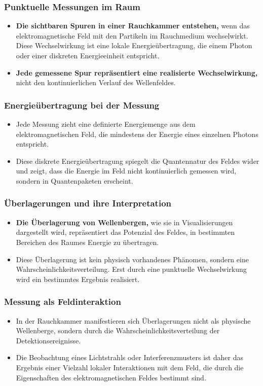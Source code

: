 \documentclass[12pt,a4paper]{article}
\begin{document}
	\subsubsection{Punktuelle Messungen im Raum}
	\begin{itemize}
		\item \textbf{Die sichtbaren Spuren in einer Rauchkammer entstehen,} wenn das elektromagnetische Feld mit den Partikeln im Rauchmedium wechselwirkt. Diese Wechselwirkung ist eine lokale Energieübertragung, die einem Photon oder einer diskreten Energieeinheit entspricht.
		\item \textbf{Jede gemessene Spur repräsentiert eine realisierte Wechselwirkung,} nicht den kontinuierlichen Verlauf des Wellenfeldes.
	\end{itemize}
	
	\subsubsection{Energieübertragung bei der Messung}
	\begin{itemize}
		\item Jede Messung zieht eine definierte Energiemenge aus dem elektromagnetischen Feld, die mindestens der Energie eines einzelnen Photons entspricht.
		\item Diese diskrete Energieübertragung spiegelt die Quantennatur des Feldes wider und zeigt, dass die Energie im Feld nicht kontinuierlich gemessen wird, sondern in Quantenpaketen erscheint.
	\end{itemize}
	
	\subsubsection{Überlagerungen und ihre Interpretation}
	\begin{itemize}
		\item \textbf{Die Überlagerung von Wellenbergen,} wie sie in Visualisierungen dargestellt wird, repräsentiert das Potenzial des Feldes, in bestimmten Bereichen des Raumes Energie zu übertragen.
		\item Diese Überlagerung ist kein physisch vorhandenes Phänomen, sondern eine Wahrscheinlichkeitsverteilung. Erst durch eine punktuelle Wechselwirkung wird ein bestimmtes Ergebnis realisiert.
	\end{itemize}
	
	\subsubsection{Messung als Feldinteraktion}
	\begin{itemize}
		\item In der Rauchkammer manifestieren sich Überlagerungen nicht als physische Wellenberge, sondern durch die Wahrscheinlichkeitsverteilung der Detektionsereignisse.
		\item Die Beobachtung eines Lichtstrahls oder Interferenzmusters ist daher das Ergebnis einer Vielzahl lokaler Interaktionen mit dem Feld, die durch die Eigenschaften des elektromagnetischen Feldes bestimmt sind.
	\end{itemize}
	
\end{document}
